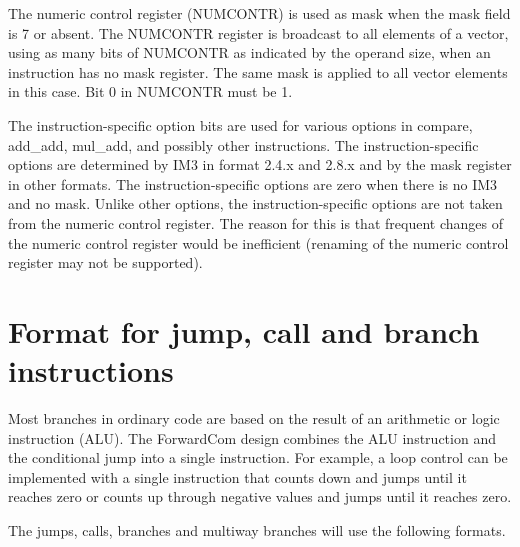\documentclass[forwardcom.tex]{subfiles}
\begin{document}
The numeric control register (NUMCONTR) is used as mask when the mask field is 7 or absent. The NUMCONTR register is broadcast to all elements of a vector, using as many bits of NUMCONTR as indicated by the operand size, when an instruction has no mask register. 
The same mask is applied to all vector elements in this case. 
Bit 0 in NUMCONTR must be 1.
\vspace{2mm}

The instruction-specific option bits are used for various options in compare, add\_add, mul\_add, and possibly other instructions. The instruction-specific options are determined by IM3 in format 2.4.x and 2.8.x and by the mask register in other formats. The instruction-specific options are zero when there is no IM3 and no mask. Unlike other options, the instruction-specific options are not taken from the numeric control register. The reason for this is that frequent changes of the numeric control register would be inefficient (renaming of the numeric control register may not be supported).


\section{Format for jump, call and branch instructions}
Most branches in ordinary code are based on the result of an arithmetic or logic instruction (ALU). The ForwardCom design combines the ALU instruction and the conditional jump into a single instruction. For example, a loop control can be implemented with a single instruction that counts down and jumps until it reaches zero or counts up through negative values and jumps until it reaches zero.
\vspace{2mm}

The jumps, calls, branches and multiway branches will use the following formats.
\end{document}

